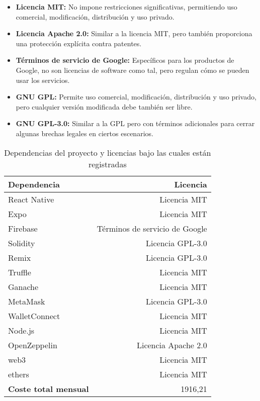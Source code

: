 \begin{itemize}

\item \textbf{Licencia MIT:} No impone restricciones significativas, permitiendo uso comercial, modificación, distribución y uso privado.

\item \textbf{Licencia Apache 2.0:} Similar a la licencia MIT, pero también proporciona una protección explícita contra patentes.

\item \textbf{Términos de servicio de Google:} Específicos para los productos de Google, no son licencias de software como tal, pero regulan cómo se pueden usar los servicios.

\item \textbf{GNU GPL:} Permite uso comercial, modificación, distribución y uso privado, pero cualquier versión modificada debe también ser libre.

\item \textbf{GNU GPL-3.0:} Similar a la GPL pero con términos adicionales para cerrar algunas brechas legales en ciertos escenarios.

\end{itemize}


\begin{table}[p]
	\centering
	\begin{tabular}{l r}
		\toprule
		\textbf{Dependencia} &  \textbf{Licencia} \\
		\midrule
    React Native & Licencia MIT \\
    Expo & Licencia MIT \\
    Firebase & Términos de servicio de Google \\
    Solidity & Licencia GPL-3.0 \\
    Remix & Licencia GPL-3.0 \\
    Truffle & Licencia MIT \\
    Ganache & Licencia MIT \\
    MetaMask & Licencia GPL-3.0 \\
    WalletConnect & Licencia MIT \\
    Node.js & Licencia MIT \\
    OpenZeppelin & Licencia Apache 2.0 \\
    web3 & Licencia MIT \\
    ethers & Licencia MIT \\
		\midrule
		\textbf{Coste total mensual} & 1916,21 \\
		\bottomrule
	\end{tabular}
	\caption[Licencias proyecto]{Dependencias del proyecto y licencias bajo las cuales están registradas}
	\label{tab:licenciasSoftware}
\end{table}


